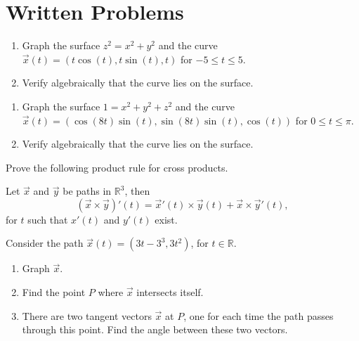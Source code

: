 \documentclass{ximera}
\begin{document}
\section*{Written Problems}
\begin{problem}
\begin{enumerate}
\item Graph the surface $z^2 = x^2 +y^2$ and the curve $\vec{x}(t) = (t\cos(t), t\sin(t), t)$ for $-5\leq t\leq 5$.
\item Verify algebraically that the curve lies on the surface.
\end{enumerate}
\end{problem}

\begin{problem}
\begin{enumerate}
\item Graph the surface $1 = x^2 + y^2 + z^2$ and the curve $\vec{x}(t) = (\cos(8t)\sin(t),\sin(8t)\sin(t), \cos(t) )$ for $0\leq t\leq \pi$.
\item Verify algebraically that the curve lies on the surface.
\end{enumerate}
\end{problem}

\begin{problem}
Prove the following product rule for cross products.

Let $\vec{x}$ and $\vec{y}$ be paths in $\mathbb{R}^3$, then 
\[
(\vec{x}\times\vec{y})'(t) = \vec{x}'(t)\times\vec{y}(t) + \vec{x}\times\vec{y}'(t),
\]
for $t$ such that $x'(t)$ and $y'(t)$ exist.
\end{problem}

\begin{problem}
Consider the path $\vec{x}(t) = (3t-3^3, 3t^2)$, for $t\in\mathbb{R}$.
\begin{enumerate}
\item Graph $\vec{x}$.
\item Find the point $P$ where $\vec{x}$ intersects itself.
\item There are two tangent vectors $\vec{x}$ at $P$, one for each time the path passes through this point. Find the angle between these two vectors.
\end{enumerate}
\end{problem}
\end{document}
